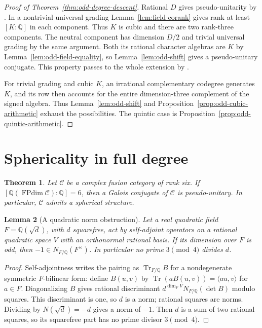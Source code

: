 \documentclass[11pt,reqno]{amsart}
\newtheorem{theorem}{Theorem}[section]
\newtheorem{lemma}[theorem]{Lemma}
\theoremstyle{remark}\newtheorem{remark}[theorem]{Remark}
\numberwithin{equation}{section}
\begin{document}
\begin{proof}[Proof of Theorem~\ref{thm:odd-degree-descent}]
Rational $D$ gives pseudo-unitarity by \cite[Proposition~8.24]{ENO}.
In a nontrivial universal grading Lemma~\ref{lem:field-corank} gives
rank at least $[K:\mathbb Q]$ in each component. Thus $K$ is cubic
and there are two rank-three components. The neutral component
has dimension $D/2$ and trivial universal grading by the same argument.
Both its rational character algebras are $K$ by
Lemma~\ref{lem:odd-field-equality}, so Lemma~\ref{lem:odd-shift}
gives a pseudo-unitary conjugate. This property passes to the whole
extension by \cite[Proposition~2.8]{BJ}.

For trivial grading and cubic $K$, an irrational complementary codegree generates $K$,
and its row then accounts for the entire dimension-three complement
of the signed algebra. Thus Lemma~\ref{lem:odd-shift} and
Proposition~\ref{prop:odd-cubic-arithmetic} exhaust the possibilities.
The quintic case is Proposition~\ref{prop:odd-quintic-arithmetic}.
\end{proof}

\section{Sphericality in full degree}
\label{sec:sextic-all}

\begin{theorem}\label{thm:sextic-all}
Let $\mathcal C$ be a complex fusion category of rank six. If
$[\mathbb Q(\operatorname{FPdim}\mathcal C):\mathbb Q]=6$, then a
Galois conjugate of $\mathcal C$ is pseudo-unitary. In particular,
$\mathcal C$ admits a spherical structure.
\end{theorem}

\begin{lemma}[A quadratic norm obstruction]\label{lem:quadratic-trace-transfer}
Let a real quadratic field $F=\mathbb Q(\sqrt d)$, with $d$ squarefree,
act by self-adjoint operators on a rational quadratic space $V$ with an
orthonormal rational basis. If its dimension over $F$ is odd, then
$-1\in N_{F/\mathbb Q}(F^\times)$. In particular no prime
$3\pmod4$ divides $d$.
\end{lemma}
\begin{proof}
Self-adjointness writes the pairing as $\operatorname{Tr}_{F/\mathbb Q}B$
for a nondegenerate symmetric $F$-bilinear form: define $B(u,v)$ by
$\operatorname{Tr}(aB(u,v))=\langle au,v\rangle$ for $a\in F$.
Diagonalizing $B$ gives rational discriminant
$d^{\dim_F V} N_{F/\mathbb Q}(\det B)$ modulo squares. This
discriminant is one, so $d$ is a norm; rational squares are norms.
Dividing by $N(\sqrt d)=-d$ gives a norm of $-1$. Then $d$ is a
sum of two rational squares, so its squarefree part has no prime
divisor $3\pmod4$.
\end{proof}
\end{document}

